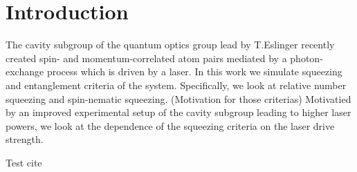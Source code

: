 \section{Introduction}
The cavity subgroup of the quantum optics group lead by T.Eslinger recently created spin- and momentum-correlated atom pairs mediated by a photon-exchange process which is driven by a laser. In this work we simulate squeezing and entanglement criteria of the system. Specifically, we look at relative number squeezing and spin-nematic squeezing. (Motivation for those criterias) Motivatied by an improved experimental setup of the cavity subgroup leading to higher laser powers, we look at the dependence of the squeezing criteria on the laser drive strength.



Test cite \cite{articleABC}
